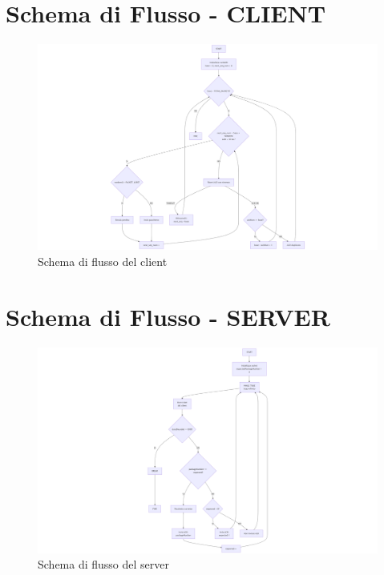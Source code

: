 \documentclass[a4paper,12pt]{article}
\begin{document}
\section{Schema di Flusso - CLIENT}

\begin{figure}[H]
    \centering
    \includegraphics[width=\paperwidth, height=0.85\textheight, keepaspectratio]{img/SchemaDiFlussoClient.png}
    \caption{Schema di flusso del client}
    \label{img: schema di flusso del client}
\end{figure}
\section{Schema di Flusso - SERVER}

\begin{figure}[H]
    \centering
    \includegraphics[width=\paperwidth, height=0.85\textheight, keepaspectratio]{img/SchemaDiFlussoServer.png}
    \caption{Schema di flusso del server}
    \label{img: schema di flusso del server}
\end{figure}
\end{document}
